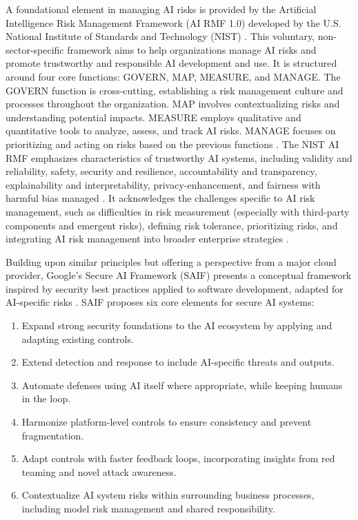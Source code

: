 A foundational element in managing AI risks is provided by the Artificial Intelligence Risk Management Framework (AI RMF 1.0) developed by the U.S. National Institute of Standards and Technology (NIST) \cite{tabassi_artificial_2023}. This voluntary, non-sector-specific framework aims to help organizations manage AI risks and promote trustworthy and responsible AI development and use. It is structured around four core functions: GOVERN, MAP, MEASURE, and MANAGE. The GOVERN function is cross-cutting, establishing a risk management culture and processes throughout the organization. MAP involves contextualizing risks and understanding potential impacts. MEASURE employs qualitative and quantitative tools to analyze, assess, and track AI risks. MANAGE focuses on prioritizing and acting on risks based on the previous functions \cite{tabassi_artificial_2023}. The NIST AI RMF emphasizes characteristics of trustworthy AI systems, including validity and reliability, safety, security and resilience, accountability and transparency, explainability and interpretability, privacy-enhancement, and fairness with harmful bias managed \cite{tabassi_artificial_2023}. It acknowledges the challenges specific to AI risk management, such as difficulties in risk measurement (especially with third-party components and emergent risks), defining risk tolerance, prioritizing risks, and integrating AI risk management into broader enterprise strategies \cite{tabassi_artificial_2023}.

Building upon similar principles but offering a perspective from a major cloud provider, Google's Secure AI Framework (SAIF) presents a conceptual framework inspired by security best practices applied to software development, adapted for AI-specific risks \cite{hansen_introducing_2023}. SAIF proposes six core elements for secure AI systems\cite{hansen_introducing_2023}:

\begin{enumerate}
    \item Expand strong security foundations to the AI ecosystem by applying and adapting existing controls.
    \item Extend detection and response to include AI-specific threats and outputs.
    \item Automate defenses using AI itself where appropriate, while keeping humans in the loop.
    \item Harmonize platform-level controls to ensure consistency and prevent fragmentation.
    \item Adapt controls with faster feedback loops, incorporating insights from red teaming and novel attack awareness.
    \item Contextualize AI system risks within surrounding business processes, including model risk management and shared responsibility.
\end{enumerate}

